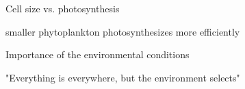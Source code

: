 \documentclass{beamer}
\begin{document}
\begin{frame}{Cell size vs. photosynthesis}


\begin{center}
\alert{smaller phytoplankton photosynthesizes more efficiently}
\end{center}


\end{frame}
\begin{frame}{Importance of the environmental conditions}

\centering \alert {"Everything is everywhere, but the environment selects"}




\end{frame}
\end{document}
